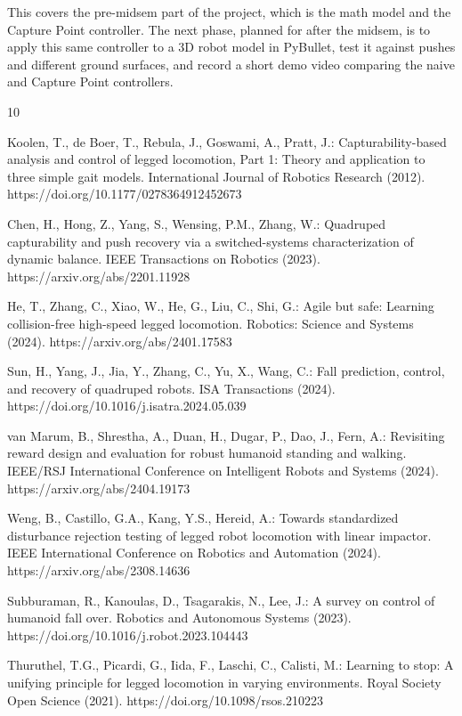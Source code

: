 \documentclass{llncs}
\begin{document}
This covers the pre-midsem part of the project, which is the math model and the Capture Point
controller. The next phase, planned for after the midsem, is to apply this same controller to a
3D robot model in PyBullet, test it against pushes and different ground surfaces, and record a
short demo video comparing the naive and Capture Point controllers.

\clearpage
\begin{thebibliography}{10}

Koolen, T., de Boer, T., Rebula, J., Goswami, A., Pratt, J.: Capturability-based analysis and
control of legged locomotion, Part 1: Theory and application to three simple gait models.
International Journal of Robotics Research (2012). https://doi.org/10.1177/0278364912452673

Chen, H., Hong, Z., Yang, S., Wensing, P.M., Zhang, W.: Quadruped capturability and push
recovery via a switched-systems characterization of dynamic balance. IEEE Transactions on
Robotics (2023). https://arxiv.org/abs/2201.11928

He, T., Zhang, C., Xiao, W., He, G., Liu, C., Shi, G.: Agile but safe: Learning collision-free
high-speed legged locomotion. Robotics: Science and Systems (2024).
https://arxiv.org/abs/2401.17583

Sun, H., Yang, J., Jia, Y., Zhang, C., Yu, X., Wang, C.: Fall prediction, control, and recovery
of quadruped robots. ISA Transactions (2024). https://doi.org/10.1016/j.isatra.2024.05.039

van Marum, B., Shrestha, A., Duan, H., Dugar, P., Dao, J., Fern, A.: Revisiting reward design
and evaluation for robust humanoid standing and walking. IEEE/RSJ International Conference on
Intelligent Robots and Systems (2024). https://arxiv.org/abs/2404.19173

Weng, B., Castillo, G.A., Kang, Y.S., Hereid, A.: Towards standardized disturbance rejection
testing of legged robot locomotion with linear impactor. IEEE International Conference on
Robotics and Automation (2024). https://arxiv.org/abs/2308.14636

Subburaman, R., Kanoulas, D., Tsagarakis, N., Lee, J.: A survey on control of humanoid fall
over. Robotics and Autonomous Systems (2023). https://doi.org/10.1016/j.robot.2023.104443

Thuruthel, T.G., Picardi, G., Iida, F., Laschi, C., Calisti, M.: Learning to stop: A unifying
principle for legged locomotion in varying environments. Royal Society Open Science (2021).
https://doi.org/10.1098/rsos.210223


\end{thebibliography}
\end{document}

